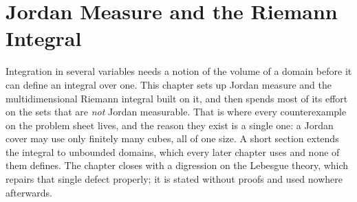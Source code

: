 \chapter{Jordan Measure and the Riemann Integral}
\label{ch:jordan_measure}

Integration in several variables needs a notion of the volume of a domain before it can define an
integral over one. This chapter sets up Jordan measure and the multidimensional Riemann integral
built on it, and then spends most of its effort on the sets that are \emph{not} Jordan
measurable. That is where every counterexample on the problem sheet lives, and the reason they
exist is a single one: a Jordan cover may use only finitely many cubes, all of one size. A short
section extends the integral to unbounded domains, which every later chapter uses and none of them
defines. The chapter closes with a digression on the Lebesgue theory, which repairs that single
defect properly; it is stated without proofs and used nowhere afterwards.





